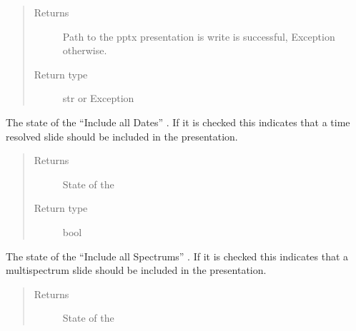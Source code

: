 \documentclass[letterpaper,10pt,english]{sphinxmanual}
\begin{document}
\begin{fulllineitems}
\begin{fulllineitems}
\begin{quote}
\begin{description}
\item[{Returns}] \leavevmode
Path to the pptx presentation is write is successful, 
Exception otherwise.

\item[{Return type}] \leavevmode
str or Exception

\end{description}\end{quote}

\end{fulllineitems}


\begin{fulllineitems}
\label{\detokenize{polo.windows:polo.windows.pptx_dialog.PptxDesignerDialog.all_dates}}
The state of the “Include all Dates” . If it is checked this
indicates that a time resolved slide should be included in the
presentation.
\begin{quote}\begin{description}
\item[{Returns}] \leavevmode
State of the 

\item[{Return type}] \leavevmode
bool

\end{description}\end{quote}

\end{fulllineitems}


\begin{fulllineitems}
\label{\detokenize{polo.windows:polo.windows.pptx_dialog.PptxDesignerDialog.all_specs}}
The state of the “Include all Spectrums” . If it is checked this
indicates that a multi\sphinxhyphen{}spectrum slide should be included in the
presentation.
\begin{quote}\begin{description}
\item[{Returns}] \leavevmode
State of the 


\end{description}
\end{quote}
\end{fulllineitems}
\end{fulllineitems}
\end{document}
